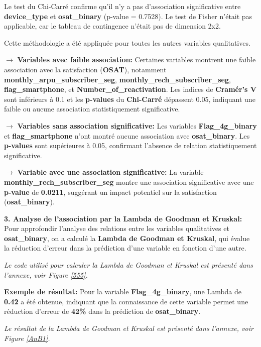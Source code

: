 Le test du Chi-Carré confirme qu'il n'y a pas d'association significative entre \textbf{device\_type} et \textbf{osat\_binary} (p-value = 0.7528). Le test de Fisher n'était pas applicable, car le tableau de contingence n'était pas de dimension 2x2.

Cette méthodologie a été appliquée pour toutes les autres variables qualitatives.

\textbf{\(\rightarrow\)} \textbf{Variables avec faible association:} Certaines variables montrent une faible association avec la satisfaction (\textbf{OSAT}), notamment \textbf{monthly\_arpu\_subscriber\_seg}, \textbf{monthly\_rech\_subscriber\_seg}, \textbf{flag\_smartphone}, et \textbf{Number\_of\_reactivation}. Les indices de \textbf{Cramér's V} sont inférieurs à 0.1 et les \textbf{p-values} du \textbf{Chi-Carré} dépassent 0.05, indiquant une faible ou aucune association statistiquement significative.


\textbf{\(\rightarrow\)} \textbf{Variables sans association significative:} Les variables \textbf{Flag\_4g\_binary} et \textbf{flag\_smartphone} n’ont montré aucune association avec \textbf{osat\_binary}. Les \textbf{p-values} sont supérieures à 0.05, confirmant l'absence de relation statistiquement significative.


\textbf{\(\rightarrow\)} \textbf{Variable avec une association significative:} La variable \textbf{monthly\_rech\_subscriber\_seg} montre une association significative avec une \textbf{p-value} de \textbf{0.0211}, suggérant un impact potentiel sur la satisfaction (\textbf{osat\_binary}).

\noindent \textbf{3. Analyse de l'association par la Lambda de Goodman et Kruskal:} Pour approfondir l'analyse des relations entre les variables qualitatives et \textbf{osat\_binary}, on a calculé la \textbf{Lambda de Goodman et Kruskal}, qui évalue la réduction d'erreur dans la prédiction d'une variable en fonction d'une autre.

\textit{Le code utilisé pour calculer la Lambda de Goodman et Kruskal est présenté dans l'annexe, voir Figure \ref{555}.}

\textbf{\checkmark Exemple de résultat:} Pour la variable \textbf{Flag\_4g\_binary}, une Lambda de \textbf{0.42} a été obtenue, indiquant que la connaissance de cette variable permet une réduction d'erreur de \textbf{42\%} dans la prédiction de \textbf{osat\_binary}.

\textit{Le résultat de la Lambda de Goodman et Kruskal est présenté dans l'annexe, voir Figure \ref{AnB1}.}


